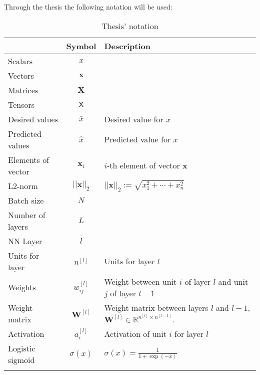 
{}

Through the thesis the following notation will be used:


\renewcommand*{\arraystretch}{2}
\begin{longtable}{l|c|p{6cm}}
    & \textbf{Symbol} & \textbf{Description} \\
  \hline\hline
  \endhead
  
  Scalars & \( x \) & \\
  Vectors & \( \bm{x} \) & \\
  Matrices & \(\bm{X}\) & \\
  Tensors & \( \bm{\mathsf{X}} \) & \\
  Desired values & \( \bar{x} \) & Desired value for \( x \) \\
  Predicted values & \( \hat{x} \) & Predicted value for \( x \) \\
  Elements of vector & \( \bm{x}_i \) & \( i \)-th element of vector \( \bm{x} \) \\
  L2-norm & \( ||\bm{x}||_2 \) &  \( ||\bm{x}||_2 := \sqrt{x_1^2 + \cdots + x_n^2} \) \\
  \hline
  Batch size & \( N \) & \\
  Number of layers & \( L \) & \\
  NN Layer & \( l \) & \\
  Units for layer & \( n^{[l]} \) & Units for layer \( l \) \\
  Weights & \( w_{ij}^{[l]} \) & Weight between unit \( i \) of layer \( l \) and unit
  \( j \) of layer \( l - 1 \) \\
  Weight matrix & \( \bm{W}^{[l]} \) & Weight 
  matrix between layers \( l \) and \( l - 1 \), 
  \( \bm{W}^{[l]} \in \mathbb{R}^{n^{[l]} \times n^{[l - 1]}} \). \\
  Activation & \( a_i^{[l]} \) & Activation of unit \( i \) for layer \( l \) \\
  Logistic sigmoid & \( \sigma(x) \) & \( \displaystyle \sigma(x) = \frac{1}{1 + \exp(-x)} \) \\
  \caption{Thesis' notation}
\end{longtable}

